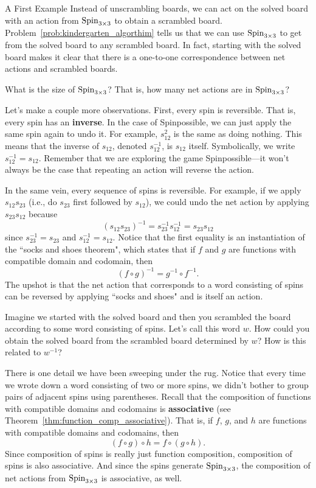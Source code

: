 \begin{section}{A First Example}
Instead of unscrambling boards, we can act on the solved board with an action from $\operatorname{Spin}_{3\times 3}$ to obtain a scrambled board.  Problem~\ref{prob:kindergarten_algorthim} tells us that we can use $\operatorname{Spin}_{3\times 3}$ to get from the solved board to any scrambled board. In fact, starting with the solved board makes it clear that there is a one-to-one correspondence between net actions and scrambled boards.

\begin{problem}
What is the size of $\operatorname{Spin}_{3\times 3}$? That is, how many net actions are in $\operatorname{Spin}_{3\times 3}$?
\end{problem}

Let's make a couple more observations.  First, every spin is reversible. That is, every spin has an \textbf{inverse}.  In the case of Spinpossible, we can just apply the same spin again to undo it.  For example, $s_{12}^2$ is the same as doing nothing. This means that the inverse of $s_{12}$, denoted $s_{12}^{-1}$, is $s_{12}$ itself. Symbolically, we write $s_{12}^{-1}=s_{12}$. Remember that we are exploring the game Spinpossible---it won't always be the case that repeating an action will reverse the action. 

In the same vein, every sequence of spins is reversible. For example, if we apply $s_{12} s_{23}$ (i.e., do $s_{23}$ first followed by $s_{12}$), we could undo the net action by applying $s_{23} s_{12}$ because
\[
(s_{12} s_{23})^{-1}=s_{23}^{-1} s_{12}^{-1}=s_{23} s_{12}
\]
since $s_{23}^{-1}=s_{23}$ and $s_{12}^{-1}=s_{12}$.  Notice that the first equality is an instantiation of the ``socks and shoes theorem", which states that if $f$ and $g$ are functions with compatible domain and codomain, then
\[
(f\circ g)^{-1} = g^{-1}\circ f^{-1}.
\]
The upshot is that the net action that corresponds to a word consisting of spins can be reversed by applying ``socks and shoes" and is itself an action.

\begin{problem}
Imagine we started with the solved board and then you scrambled the board according to some word consisting of spins.  Let's call this word $w$. How could you obtain the solved board from the scrambled board determined by $w$? How is this related to $w^{-1}$?
\end{problem}

There is one detail we have been sweeping under the rug.  Notice that every time we wrote down a word consisting of two or more spins, we didn't bother to group pairs of adjacent spins using parentheses.  Recall that the composition of functions with compatible domains and codomains is \textbf{associative} (see Theorem~\ref{thm:function_comp_associative}).  That is, if $f$, $g$, and $h$ are functions with compatible domains and codomains, then
\[
(f\circ g)\circ h = f\circ (g\circ h).
\]
Since composition of spins is really just function composition, composition of spins is also associative.  And since the spins generate $\operatorname{Spin}_{3\times 3}$, the composition of net actions from $\operatorname{Spin}_{3\times 3}$ is associative, as well.


\end{section}
